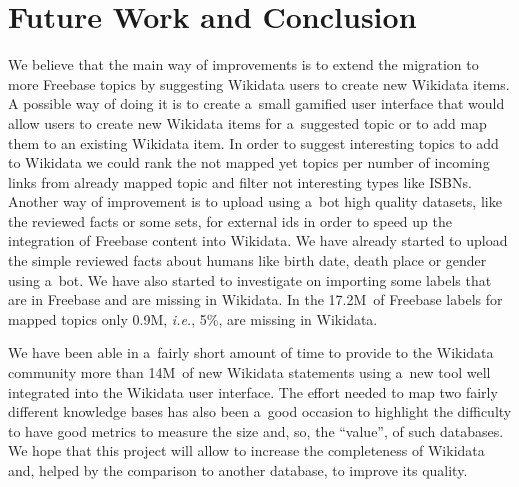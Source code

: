 \documentclass{sig-alternate}
\begin{document}
\section{Future Work and Conclusion}\label{sec:future-work-and-conclusion}

We believe that the main way of improvements is to extend the migration to more Freebase topics
by suggesting Wikidata users to create new Wikidata items.
A possible way of doing it is to create a~small gamified user interface that would allow users
to create new Wikidata items for a~suggested topic or to add map them to an existing Wikidata item.
In order to suggest interesting topics to add to Wikidata
we could rank the not mapped yet topics per number of incoming links from already mapped topic
and filter not interesting types like ISBNs.
Another way of improvement is to upload using a~bot high quality datasets,
like the reviewed facts or some sets,
for external ids in order to speed up the integration of Freebase content into Wikidata.
We have already started to upload the simple reviewed facts about humans
like birth date, death place or gender using a~bot.
We have also started to investigate on importing some labels
that are in Freebase and are missing in Wikidata.
In the 17.2M~of Freebase labels for mapped topics only 0.9M, \emph{i.e.},
5\%, are missing in Wikidata.

We have been able in a~fairly short amount of time to provide to the Wikidata community
more than 14M~of new Wikidata statements using a~new tool
well integrated into the Wikidata user interface.
The effort needed to map two fairly different knowledge bases has also been a~good occasion
to highlight the difficulty to have good metrics to measure the size
and, so, the ``value'', of such databases.
We hope that this project will allow to increase the completeness of Wikidata and,
helped by the comparison to another database, to improve its quality.




\balancecolumns
\end{document}
